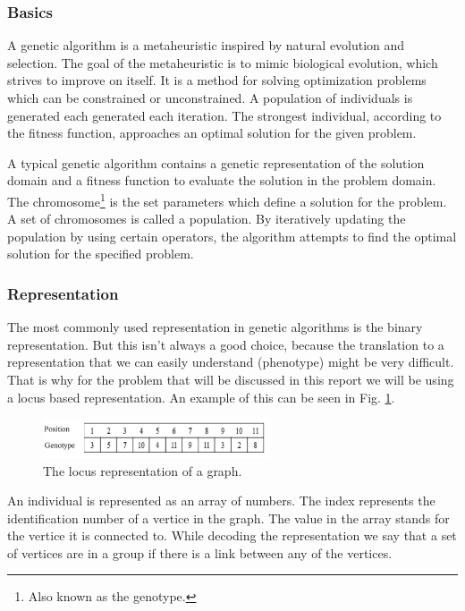 \subsubsection{Basics}
A genetic algorithm is a metaheuristic inspired by natural evolution and selection.
The goal of the metaheuristic is to mimic biological evolution, which strives to improve on itself.
It is a method for solving optimization problems which can be constrained or unconstrained.
A population of individuals is generated each generated each iteration.
The strongest individual, according to the fitness function, approaches an optimal solution for the given problem.

A typical genetic algorithm contains a genetic representation of the solution domain and a fitness function to evaluate the solution in the problem domain.
The chromosome\footnote{Also known as the genotype.} is the set parameters which define a solution for the problem.
A set of chromosomes is called a population.
By iteratively updating the population by using certain operators, the algorithm attempts to find the optimal solution for the specified problem.

\subsubsection{Representation}
The most commonly used representation in genetic algorithms is the binary representation.
But this isn't always a good choice, because the translation to a representation that we can easily understand (phenotype) might be very difficult.
That is why for the problem that will be discussed in this report we will be using a locus based representation.
An example of this can be seen in Fig. \ref{figure:locus}.

\begin{figure}
\begin{center}
\includegraphics[width=0.6\textwidth]{locus.png}
\caption{The locus representation of a graph.}\label{figure:locus}
\end{center}
\end{figure}

An individual is represented as an array of numbers. 
The index represents the identification number of a vertice in the graph.
The value in the array stands for the vertice it is connected to.
While decoding the representation we say that a set of vertices are in a group if there is a link between any of the vertices.

